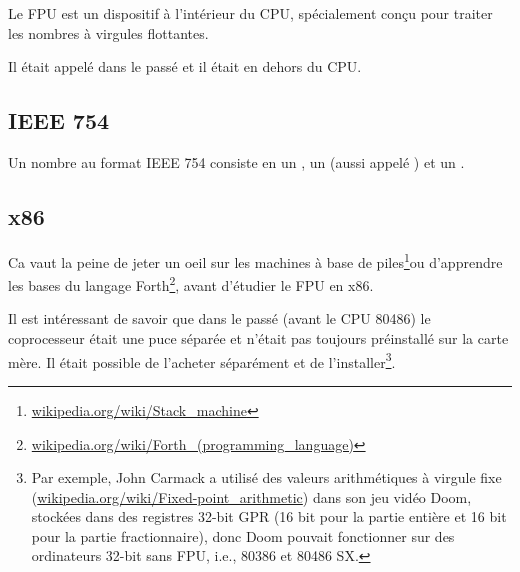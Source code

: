 ﻿\section{\FPUChapterName}
\label{sec:FPU}

\newcommand{\FNURLSTACK}{\footnote{\href{http://go.yurichev.com/17123}{wikipedia.org/wiki/Stack\_machine}}}
\newcommand{\FNURLFORTH}{\footnote{\href{http://go.yurichev.com/17124}{wikipedia.org/wiki/Forth\_(programming\_language)}}}
\newcommand{\FNURLIEEE}{\footnote{\href{http://go.yurichev.com/17125}{wikipedia.org/wiki/IEEE\_floating\_point}}}
\newcommand{\FNURLSP}{\footnote{\href{http://go.yurichev.com/17126}{wikipedia.org/wiki/Single-precision\_floating-point\_format}}}
\newcommand{\FNURLDP}{\footnote{\href{http://go.yurichev.com/17127}{wikipedia.org/wiki/Double-precision\_floating-point\_format}}}
\newcommand{\FNURLEP}{\footnote{\href{http://go.yurichev.com/17128}{wikipedia.org/wiki/Extended\_precision}}}

Le \ac{FPU} est un dispositif à l'intérieur du \ac{CPU}, spécialement conçu pour
traiter les nombres à virgules flottantes.

Il était appelé  dans le passé et il était en dehors du \ac{CPU}.

\subsection{IEEE 754}

Un nombre au format IEEE 754 consiste en un , un  (aussi
appelé ) et un .

\subsection{x86}

Ca vaut la peine de jeter un oeil sur les machines à base de piles\FNURLSTACK ou
d'apprendre les bases du langage Forth\FNURLFORTH, avant d'étudier le \ac{FPU} en
x86.

Il est intéressant de savoir que dans le passé (avant le CPU 80486) le coprocesseur
était une puce séparée et n'était pas toujours préinstallé sur la carte mère. Il
était possible de l'acheter séparément et de l'installer\footnote{Par exemple, John
Carmack a utilisé des valeurs arithmétiques à virgule fixe
(\href{http://go.yurichev.com/17356}{wikipedia.org/wiki/Fixed-point\_arithmetic})
dans son jeu vidéo Doom, stockées dans des registres 32-bit \ac{GPR} (16 bit pour
la partie entière et 16 bit pour la partie fractionnaire), donc Doom pouvait fonctionner
sur des ordinateurs 32-bit sans FPU, i.e., 80386 et 80486 SX.}.

